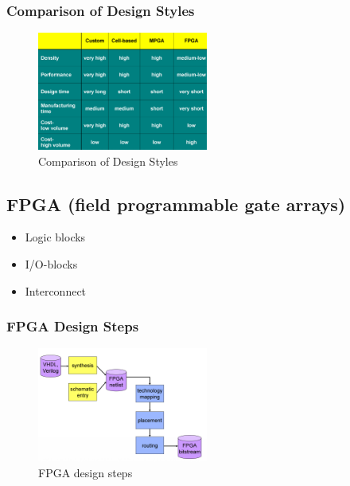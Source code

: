 \subsubsection{Comparison of Design Styles}
\begin{figure}[h]
	\begin{center}
		\includegraphics[width=0.5\textwidth]{images/Comp_Des_Sty.png}
		\caption{Comparison of Design Styles}
		\label{fig:Comp_Des_Sty}
	\end{center}
\end{figure}

\subsection{FPGA (field programmable gate arrays)}
\begin{itemize}
	\item Logic blocks
	\item I/O-blocks
	\item Interconnect
\end{itemize}

\subsubsection{FPGA Design Steps}
\begin{figure}[h]
	\begin{center}
		\includegraphics[width=0.5\textwidth]{images/FPGA_Design.png}
		\caption{FPGA design steps}
		\label{fig:FPGA_Des}
	\end{center}
\end{figure}

